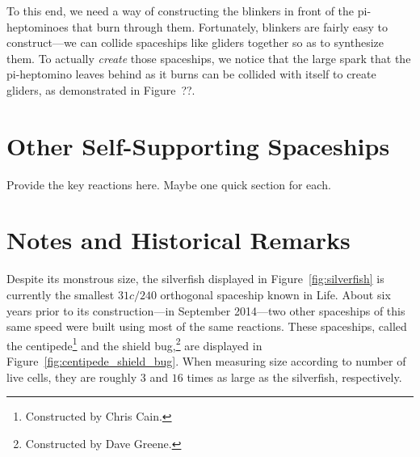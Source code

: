 To this end, we need a way of constructing the blinkers in front of the pi-heptominoes that burn through them. Fortunately, blinkers are fairly easy to construct---we can collide spaceships like gliders together so as to synthesize them. To actually \emph{create} those spaceships, we notice that the large spark that the pi-heptomino leaves behind as it burns can be collided with itself to create gliders, as demonstrated in Figure~??.




\section{Other Self-Supporting Spaceships}\label{sec:other_self_support}

Provide the key reactions here. Maybe one quick section for each.



\section{Notes and Historical Remarks}\label{sec:self_support_history}

Despite its monstrous size, the silverfish displayed in Figure~\ref{fig:silverfish} is currently the smallest $31c/240$ orthogonal spaceship known in Life. About six years prior to its construction---in September 2014---two other spaceships of this same speed were built using most of the same reactions. These spaceships, called the centipede\footnote{Constructed by Chris Cain.} and the shield bug,\footnote{Constructed by Dave Greene.} are displayed in Figure~\ref{fig:centipede_shield_bug}. When measuring size according to number of live cells, they are roughly $3$ and $16$ times as large as the silverfish, respectively.






